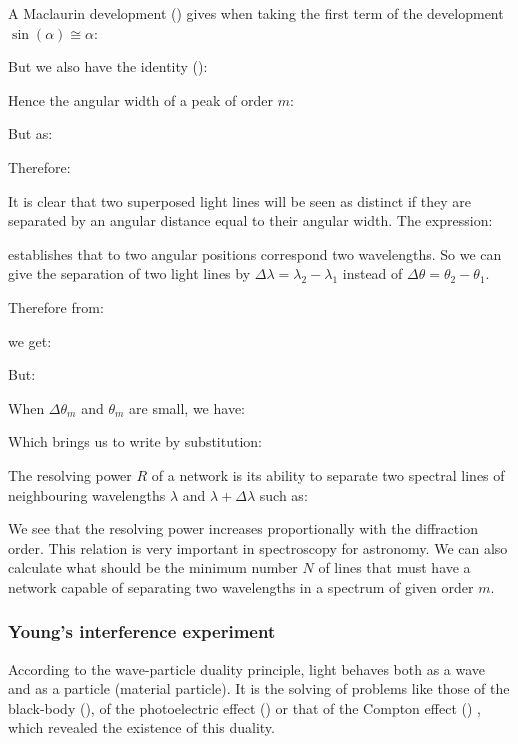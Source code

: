 	A Maclaurin development () gives when taking the first term of the development $\sin(\alpha)\cong \alpha$:
	
	But we also have the identity ():
	
	Hence the angular width of a peak of order $m$:
	
	But as:
	
	Therefore:
	
	It is clear that two superposed light lines will be seen as distinct if they are separated by an angular distance equal to their angular width. The expression:
	
	establishes that to two angular positions correspond two wavelengths. So we can give the separation of two light lines by $\Delta \lambda=\lambda_2-\lambda_1$ instead of $\Delta\theta=\theta_2-\theta_1$.
	
	Therefore from:
	
	we get:
	
	But:
	
	When $\Delta \theta_m$ and $\theta_m$ are small, we have:
	
	Which brings us to write by substitution:
	
	The resolving power $R$ of a network is its ability to separate two spectral lines of neighbouring wavelengths $\lambda$ and $\lambda+\Delta\lambda$ such as:
	
	We see that the resolving power increases proportionally with the diffraction order. This relation is very important in spectroscopy for astronomy. We can also calculate what should be the minimum number $N$ of lines that must have a network capable of separating two wavelengths in a spectrum of given order $m$.
	
	\subsubsection{Young's interference experiment}\label{young interference experiment}
	According to the wave-particle duality principle, light behaves both as a wave and as a particle (material particle). It is the solving of problems like those of the black-body (), of the photoelectric effect () or that of the Compton effect () , which revealed the existence of this duality.

